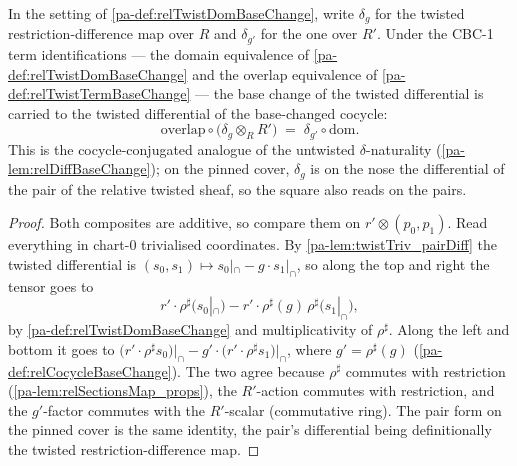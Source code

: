\begin{theorem}
  \label{pa-thm:relTwistDiffBaseChange}
  \leanok

  In the setting of \ref{pa-def:relTwistDomBaseChange}, write \(\delta_g\) for the
  twisted restriction-difference map over \(R\) and \(\delta_{g'}\) for the one over
  \(R'\). Under the CBC-1 term identifications --- the domain equivalence of
  \ref{pa-def:relTwistDomBaseChange} and the overlap equivalence of
  \ref{pa-def:relTwistTermBaseChange} --- the base change of the twisted differential is
  carried to the twisted differential of the base-changed cocycle:
  \[
    \mathrm{overlap}\circ\bigl(\delta_g \otimes_R R'\bigr)
      \;=\; \delta_{g'} \circ \mathrm{dom} .
  \]
  This is the cocycle-conjugated analogue of the untwisted \(\delta\)-naturality
  (\ref{pa-lem:relDiffBaseChange}); on the pinned cover, \(\delta_g\) is on the nose the
  differential of the pair of the relative twisted sheaf, so the square also reads on
  the pairs.
\end{theorem}
\begin{proof}
  \leanok
  Both composites are additive, so compare them on \(r' \otimes (p_0, p_1)\). Read
  everything in chart-0 trivialised coordinates. By \ref{pa-lem:twistTriv_pairDiff} the
  twisted differential is \((s_0, s_1) \mapsto s_0|_{\cap} - g \cdot s_1|_{\cap}\), so
  along the top and right the tensor goes to
  \[
    r' \cdot \rho^{\sharp}\bigl(s_0|_{\cap}\bigr)
      - r' \cdot \rho^{\sharp}(g)\,\rho^{\sharp}\bigl(s_1|_{\cap}\bigr),
  \]
  by \ref{pa-def:relTwistDomBaseChange} and multiplicativity of \(\rho^{\sharp}\). Along
  the left and bottom it goes to
  \(\bigl(r' \cdot \rho^{\sharp}s_0\bigr)\big|_{\cap} - g' \cdot \bigl(r' \cdot
  \rho^{\sharp}s_1\bigr)\big|_{\cap}\), where \(g' = \rho^{\sharp}(g)\)
  (\ref{pa-def:relCocycleBaseChange}). The two agree because \(\rho^{\sharp}\) commutes
  with restriction (\ref{pa-lem:relSectionsMap_props}), the \(R'\)-action commutes with
  restriction, and the \(g'\)-factor commutes with the \(R'\)-scalar (commutative
  ring). The pair form on the pinned cover is the same identity, the pair's
  differential being definitionally the twisted restriction-difference map.
\end{proof}

